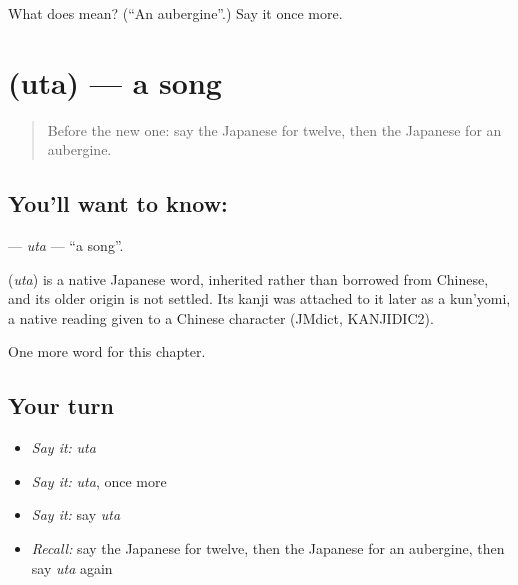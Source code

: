 \begin{tcolorbox}[breakable,colback=teal!4,colframe=teal!35!black,title={Before you move on}]
What does  mean? (\textquotedblleft{}An aubergine\textquotedblright{}.) Say it once more.
\end{tcolorbox}
\section[\texorpdfstring{\ja{うた} (uta)}{うた (uta)}]{ (uta) — a song}

\label{lesson:JA-C60-uta}



\begin{quote}
Before the new one: say the Japanese for twelve, then the Japanese for an aubergine.
\end{quote}

\subsection*{You'll want to know: }
\textbf{} — \emph{uta} — \textquotedblleft{}a song\textquotedblright{}.

\begin{cousinweb}
\textbf{} (\emph{uta}) is a native Japanese word, inherited rather than borrowed from Chinese, and its older origin is not settled. Its kanji was attached to it later as a kun'yomi, a native reading given to a Chinese character (JMdict, KANJIDIC2).
\end{cousinweb}

\begin{grammarlens}[title={What you've built}]
One more word for this chapter.
\end{grammarlens}

\subsection*{Your turn}
\begin{itemize}
\raggedright
  \item \emph{Say it:} \emph{uta}
  \item \emph{Say it:} \emph{uta}, once more
  \item \emph{Say it:} say \emph{uta}
  \item \emph{Recall:} say the Japanese for twelve, then the Japanese for an aubergine, then say \emph{uta} again
\end{itemize}

